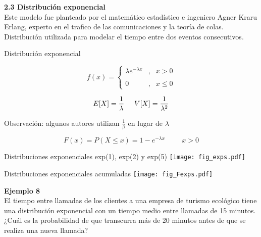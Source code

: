 \documentclass[base=hide,12pt]{elegantbook}
\begin{document}
\textcolor{col4}{\LARGE  \bf 2.3 Distribución exponencial }\\

Este modelo fue  planteado por el matemático estadístico e ingeniero Agner Kraru Erlang, experto en el trafico de las comunicaciones y la teoría de colas. 
Distribución utilizada para modelar el tiempo entre dos eventos consecutivos. \\

\begin{Box2}{Distribución exponencial }
	
	\begin{equation*}
		f(x)=\left\lbrace
		\begin{array}{lll}
			\lambda e^{-\lambda x}  &,& x > 0   \\
			&&\\
			0 &,& x \leq 0 
		\end{array}
		\right.
	\end{equation*}
	
	$$E[X]=\dfrac{1}{\lambda}  \hspace{.5cm} V[X]= \dfrac{1}{\lambda^{2}}$$
	
	\noindent Observación: algunos autores utilizan $\frac{1}{\beta}$ en lugar de $\lambda$
	
	$$F(x)=P(X \leq x)=1-e^{-\lambda x} \hspace{1cm} x > 0$$	
\end{Box2}

\begin{center}
	Distribuciones exponenciales \textcolor{col4}{exp(1)}, \textcolor{col5}{exp(2)} y \textcolor{col3}{exp(5)}
	\texttt{[image: fig\_exps.pdf]}
\end{center} 
\begin{center}
	Distribuciones exponenciales acumuladas
	\texttt{[image: fig\_Fexps.pdf]}
\end{center} 

\vspace{.5cm} 
\textcolor{col3}{\bf \large Ejemplo 8}\\
El tiempo entre llamadas de los clientes a una empresa de turismo ecológico tiene una distribución exponencial con un tiempo medio entre llamadas de 15 minutos. ¿Cuál es la probabilidad de que transcurra más de 20 minutos antes de que se realiza una nueva llamada?\\
\end{document}
